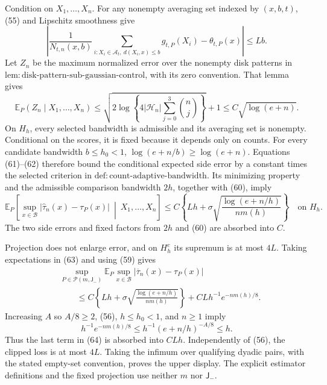 Condition on \(X_1,\ldots,X_n\).  For any nonempty averaging set indexed
by \((x,b,t)\), (55) and Lipschitz smoothness give
\[
 \left|
 \frac1{N_{t,n}(x,b)}
 \sum_{i:X_i\in\mathcal A_t,\ d(X_i,x)\le b}g_{t,P}(X_i)
 -\theta_{t,P}(x)
 \right|\le Lb. \tag{61}
\]
Let \(Z_n\) be the maximum normalized error over the nonempty disk
patterns in
\(\mathrm{lem:disk\text{-}pattern\text{-}sub\text{-}gaussian\text{-}control}\),
with its zero convention.  That lemma gives
\[
 \mathbb E_P(Z_n\mid X_1,\ldots,X_n)
 \le\sqrt{2\log\left\{4|\mathcal H_n|
 \sum_{j=0}^{3}\binom nj\right\}}+1
 \le C\sqrt{\log(e+n)}. \tag{62}
\]
On \(H_h\), every selected bandwidth is admissible and its averaging set
is nonempty.  Conditional on the scores, it is fixed because it depends
only on counts.  For every candidate bandwidth \(b\le h_0<1\),
\(\log(e+n/b)\ge\log(e+n)\).  Equations (61)--(62) therefore bound the
conditional expected side error by a constant times the selected
criterion in
\(\mathrm{def:count\text{-}adaptive\text{-}bandwidth}\).  Its minimizing
property and the admissible comparison bandwidth \(2h\), together with
(60), imply
\[
 \mathbb E_P\left[
 \sup_{x\in\mathcal B}|\widehat\tau_n(x)-\tau_P(x)|
 \ \middle|\ X_1,\ldots,X_n
 \right]
 \le C\left\{Lh+
 \sigma\sqrt{\frac{\log(e+n/h)}{nm(h)}}\right\}
 \quad\text{on }H_h. \tag{63}
\]
The two side errors and fixed factors from \(2h\) and (60) are absorbed
into \(C\).

Projection does not enlarge error, and on \(H_h^c\) its supremum is at
most \(4L\).  Taking expectations in (63) and using (59) gives
\[
 \begin{aligned}
 &\sup_{P\in\mathcal P(m,\mathsf J_{-})}
 \mathbb E_P\sup_{x\in\mathcal B}
 |\overline\tau_n(x)-\tau_P(x)|\\
 &\qquad\le C\left\{Lh+
 \sigma\sqrt{\frac{\log(e+n/h)}{nm(h)}}\right\}
 +CLh^{-1}e^{-nm(h)/8}.
 \end{aligned} \tag{64}
\]
Increasing \(A\) so \(A/8\ge2\), (56), \(h\le h_0<1\), and \(n\ge1\)
imply
\[
 h^{-1}e^{-nm(h)/8}
 \le h^{-1}(e+n/h)^{-A/8}
 \le h.
\]
Thus the last term in (64) is absorbed into \(CLh\).  Independently of
(56), the clipped loss is at most \(4L\).  Taking the infimum over
qualifying dyadic pairs, with the stated empty-set convention, proves the
upper display.  The explicit estimator definitions and the fixed
projection use neither \(m\) nor \(\mathsf J_{-}\).


